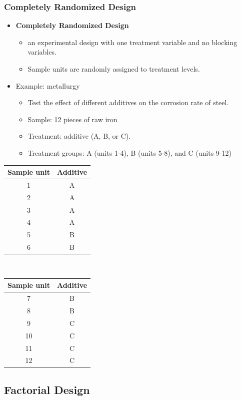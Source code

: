 \documentclass[handout]{beamer}
\numberwithin{equation}{section}
\begin{document}
\begin{frame}
\frametitle{Completely Randomized Design} \small

\begin{itemize}
\item {\bf Completely Randomized Design} 
\begin{itemize}
\pause \item an experimental design with one treatment variable and no blocking variables.
\pause \item Sample units are randomly assigned to treatment levels.
\end{itemize} 
\pause \item Example: metallurgy
\begin{itemize}
 \item Test the effect of different additives on the corrosion rate of steel. 
\pause \item Sample: 12 pieces of raw iron
\pause \item Treatment: additive (A, B, or C).
\pause \item Treatment groups: A (units 1-4), B (units 5-8), and C (units 9-12)
\end{itemize} 
\end{itemize}
\scriptsize
\begin{center}
\begin{tabular}{c|c}
Sample unit & Additive \\ \hline
1 & A \\ 
2 & A \\ 
3 & A \\ 
4 & A \\ 
5 & B \\ 
6 & B \\ 
\end{tabular} $\quad$ \begin{tabular}{c|c}
Sample unit & Additive \\ \hline
7 & B \\ 
8 & B \\ 
9 & C \\ 
10 & C \\ 
11 & C \\ 
12 & C \\ 
\end{tabular}
\end{center}
\end{frame}

\subsection{Factorial Design}
\end{document}
